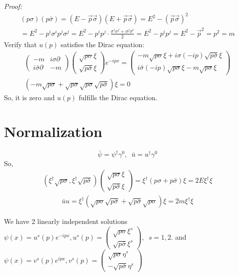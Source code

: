 \documentclass[]{scrartcl}
\begin{document}
\textit{Proof:}\\
\begin{gather}
	(p\sigma)(p\bar\sigma) = (E - \vec p \vec\sigma)(E + \vec p\vec\sigma) = E^2 - (\vec p \vec\sigma)^2\\
	= E^2 - p^i \sigma^i p^j \sigma^j = E^2 - p^i p^j \cdot \frac{\sigma^i\sigma^j + \sigma^j\sigma^i}{2} = E^2 - p^i p^j = E^2 - \vec p ^2 = p^2 = m
\end{gather}
Verify that $u(p)$ satisfies the Dirac equation:
\begin{gather}
	\begin{pmatrix}
		-m & i\sigma\partial\\
		i\bar\sigma\partial & -m
	\end{pmatrix}
	\begin{pmatrix}
		\sqrt{p\sigma}\xi\\
		\sqrt{p\bar\sigma}\xi
	\end{pmatrix} e^{-ipx} =
	\begin{pmatrix}
		-m\sqrt{p\sigma}\xi + i\sigma(-ip)\sqrt{p\bar\sigma}\xi\\
		i\bar\sigma(-ip)\sqrt{p\sigma}\xi - m\sqrt{p\sigma}\xi
	\end{pmatrix}\\
	(-m\sqrt{p\sigma} + \sqrt{p\sigma}\sqrt{p\sigma}\sqrt{p\bar\sigma})\xi = 0
\end{gather}
So, it is zero and $u(p)$ fulfills the Dirac equation.

\section{Normalization}
\begin{equation}
	\bar\psi = \psi^\dagger \gamma^0,\;\;\bar u = u^\dagger \gamma^0
\end{equation}
So,
\begin{gather}
	(\xi^\dagger \sqrt{p\sigma}, \xi^\dagger \sqrt{p\bar\sigma})
	\begin{pmatrix}
		\sqrt{p\sigma}\xi \\ \sqrt{p\bar\sigma}\xi
	\end{pmatrix} = \xi^\dagger (p\sigma + p\bar\sigma)\xi  = 2E\xi^\dagger\xi
\end{gather}
\begin{gather}
	\bar u u = \xi^\dagger(\sqrt{p\sigma}\sqrt{p\bar\sigma} + \sqrt{p \bar\sigma}\sqrt{p\sigma})\xi = 2m\xi^\dagger \xi
\end{gather}

We have 2 linearly independent solutions $\psi(x) = u^s(p)e^{-ipx}, u^s(p)=
\begin{pmatrix}
	\sqrt{p\sigma}\xi^s \\ \sqrt{p \bar\sigma}\xi^s
\end{pmatrix},\;\; s = 1,2$.
and $\psi(x) = v^s(p)e^{ipx}, v^s(p) = 
\begin{pmatrix}
	\sqrt{p\sigma}\eta^s \\ -\sqrt{p \bar\sigma}\eta^s
\end{pmatrix}$
\end{document}
